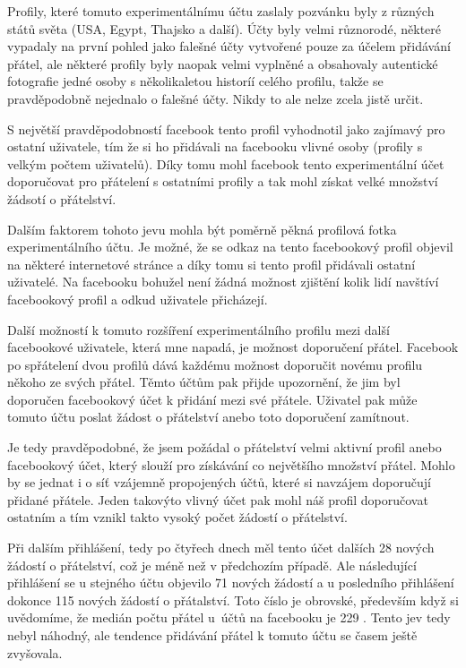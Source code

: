 \documentclass[thesis=M,czech]{FITthesis}[2013/05/10]
\begin{document}
Profily, které tomuto experimentálnímu účtu zaslaly pozvánku byly z různých států světa (USA, Egypt, Thajsko a další). Účty byly velmi různorodé, některé vypadaly na první pohled jako falešné účty vytvořené pouze za účelem přidávání přátel, ale některé profily byly naopak velmi vyplněné a obsahovaly autentické fotografie jedné osoby s několikaletou historíí celého profilu, takže se pravděpodobně nejednalo o falešné účty. Nikdy to ale nelze zcela jistě určit. 

S největší pravděpodobností facebook tento profil vyhodnotil jako zajímavý pro ostatní uživatele, tím že si ho přidávali na facebooku vlivné osoby (profily s velkým počtem uživatelů). Díky tomu mohl facebook tento experimentální účet doporučovat pro přátelení s ostatními profily a tak mohl získat velké množství žádsotí o přátelství.

Dalším faktorem tohoto jevu mohla být poměrně pěkná profilová fotka experimentálního účtu. Je možné, že se odkaz na tento facebookový profil objevil na některé internetové stránce a díky tomu si tento profil přidávali ostatní uživatelé. Na facebooku bohužel není žádná možnost zjištění kolik lidí navštíví facebookový profil a odkud uživatele přicházejí.

Další možností k tomuto rozšíření experimentálního profilu mezi další facebookové uživatele, která mne napadá, je možnost doporučení přátel. Facebook po spřátelení dvou profilů dává každému možnost doporučit novému profilu někoho ze svých přátel. Těmto účtům pak přijde upozornění, že jim byl doporučen facebookový  účet k přidání mezi své přátele. Uživatel pak může tomuto účtu poslat žádost o přátelství anebo toto doporučení zamítnout. 

Je tedy pravděpodobné, že jsem požádal o přátelství velmi aktivní profil anebo facebookový účet, který slouží pro získávání co největšího množství přátel. Mohlo by se jednat i o síť vzájemně propojených účtů, které si navzájem doporučují přidané přátele. Jeden takovýto vlivný účet pak mohl náš profil doporučovat ostatním a tím vznikl takto vysoký počet žádostí o přátelství.

Při dalším přihlášení, tedy po čtyřech dnech měl tento účet dalších 28 nových žádostí o přátelství, což je méně než v předchozím případě. Ale následující přihlášení se u stejného účtu objevilo 71 nových žádostí a u posledního přihlášení dokonce 115 nových žádostí o přátalství. Toto číslo je obrovské, především když si uvědomíme, že medián počtu přátel u~účtů na facebooku je 229 \cite{web:fbFriendsMedian}. Tento jev tedy nebyl náhodný, ale tendence přidávání přátel k tomuto účtu se časem ještě zvyšovala.
\end{document}
